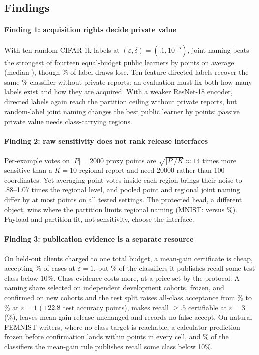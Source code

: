 \subsection{Findings}

\paragraph{Finding 1: acquisition rights decide private value}
With ten random CIFAR-1k labels at $(\varepsilon,\delta)=(.1,10^{-5})$, joint
naming beats the strongest of fourteen equal-budget public learners by
\JointGain{} points on average (median \GainMedian{}), though
\GainNegativeDraws{}\% of label draws lose. Ten feature-directed labels
recover the same \CeilCifar{}\% classifier without private reports: an
evaluation must fix both how many labels exist and how they are acquired.
With a weaker ResNet-18 encoder, directed labels again reach the partition
ceiling without private reports, but random-label joint naming changes the
best public learner by \EncGain{} points: passive private value
needs class-carrying regions.

\paragraph{Finding 2: raw sensitivity does not rank release interfaces}
Per-example votes on $|P|=2000$ proxy points are $\sqrt{|P|/K}\approx14$
times more sensitive than a $K=10$ regional report and need 20000 rather than
100 coordinates. Yet averaging point votes inside each region brings their
noise to .88--1.07 times the regional level, and pooled point and regional
joint naming differ by at most \PointRegionMaxGap{} points on all
\PointRegionSettings{} tested settings. The protected head, a different
object, wins where the partition limits regional naming (MNIST:
\HeadMnistTenK{} versus \RegionMnistTenK{}\%). Payload and partition fit, not
sensitivity, choose the interface.

\paragraph{Finding 3: publication evidence is a separate resource}
On held-out clients charged to one total budget, a mean-gain certificate is
cheap, accepting \MiddleGlobalAccept{}\% of cases at $\varepsilon=1$, but
\MinRecGainOneTenth{}\% of the classifiers it publishes recall some test class
below $10\%$. Class evidence costs more, at a price set by the protocol. A naming share selected on independent
development cohorts, frozen, and confirmed on new cohorts and the test split
raises all-class acceptance from \BCFixedRecallOne{}\% to
\BCFrozenRecallOne{}\% at $\varepsilon=1$ ($+22.8$ test
accuracy points), makes recall $\ge.5$ certifiable at $\varepsilon=3$
(\BCFrozenHalfThree{}\%), leaves mean-gain release unchanged and records no
false accept. On natural FEMNIST writers, where no class target is reachable,
a calculator prediction frozen before confirmation lands within \FCPlanGap{}
points in every cell, and \FCTail{}\% of the classifiers the mean-gain rule
publishes recall some class below 10\%.

